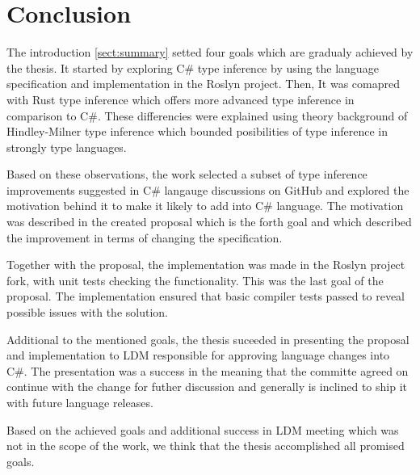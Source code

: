 \chapter*{Conclusion}

The introduction \ref{sect:summary} setted four goals which are gradualy achieved by the thesis.
It started by exploring C\# type inference by using the language specification and implementation in the Roslyn project.
Then, It was comapred with Rust type inference which offers more advanced type inference in comparison to C\#.
These differencies were explained using theory background of Hindley-Milner type inference which bounded posibilities of type inference in strongly type languages.
\par
Based on these observations, the work selected a subset of type inference improvements suggested in C\# langauge discussions on GitHub and explored the motivation behind it to make it likely to add into C\# language.
The motivation was described in the created proposal which is the forth goal and which described the improvement in terms of changing the specification.
\par
Together with the proposal, the implementation was made in the Roslyn project fork, with unit tests checking the functionality.
This was the last goal of the proposal.
The implementation ensured that basic compiler tests passed to reveal possible issues with the solution.
\par
Additional to the mentioned goals, the thesis suceeded in presenting the proposal and implementation to \ac{LDM} responsible for approving language changes into C\#.
The presentation was a success in the meaning that the committe agreed on continue with the change for futher discussion and generally is inclined to ship it with future language releases.
\par
Based on the achieved goals and additional success in \ac{LDM} meeting which was not in the scope of the work, we think that the thesis accomplished all promised goals.
